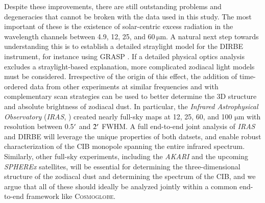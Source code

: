 \documentclass{aa}
\def\Cosmoglobe{\textsc{Cosmoglobe}}
\def\Planck{\textit{Planck}}
\begin{document}


Despite these improvements, there are still outstanding problems and degeneracies that cannot be broken with the data used in this study. The most important of these is the existence of solar-centric excess radiation in the wavelength channels between 4.9, 12, 25, and 60\,$\mathrm{\mu m}$. A natural next step towards understanding this is to establish a detailed straylight model for the DIRBE instrument, for instance using GRASP \citep{grasp}. If a detailed physical optics analysis excludes a straylight-based explanation, more complicated zodiacal light models must be considered. Irrespective of the origin of this effect, the addition of time-ordered data from other experiments at similar frequencies and with complementary scan strategies can be used to better determine the 3D structure and absolute brightness of zodiacal dust. In particular, the \textit{Infrared Astrophysical Observatory} (\textit{IRAS}, \citealt{boggess92}) created nearly full-sky maps at 12, 25, 60, and 100 $\mathrm{\mu m}$ with resolution between 0.5$\arcm$ and $2\arcm$ FWHM. A full end-to-end joint analysis of \textit{IRAS} and DIRBE will leverage the unique properties of both datsets, and enable robust characterization of the CIB monopole spanning the entire infrared spectrum. Similarly, other full-sky experiments, including the \textit{AKARI} \citep{murakami:2007} and the upcoming \textit{SPHEREx} \citep{dore:2014} satellites, will be essential for determining the three-dimensional structure of the zodiacal dust and determining the spectrum of the CIB, and we argue that all of these should ideally be analyzed jointly within a common end-to-end framework like \Cosmoglobe. 
\end{document}
